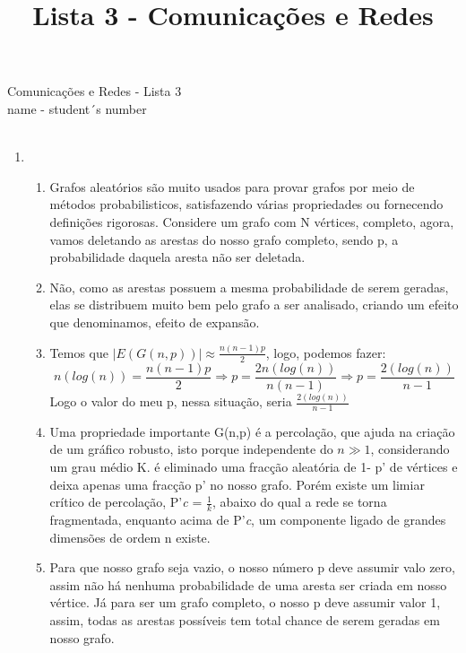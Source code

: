 \documentclass[11pt,reqno]{amsart}
\title {Lista 3 - Comunicações e Redes}
\author{}
\date{}
\begin{document}
	\begin{center}
		Comunicações e Redes - Lista 3\\
		name - student´s number \\ \ \\
	\end{center}

	\begin{enumerate}

		\item

		\vspace{0.3cm}

		\begin{enumerate}
			\item Grafos aleatórios são muito usados para provar grafos por meio de métodos probabilisticos,
			 satisfazendo várias propriedades ou fornecendo definições rigorosas. Considere um grafo com 
			 N vértices, completo, agora, vamos deletando as arestas do nosso grafo completo, sendo p, a 
			 probabilidade daquela aresta não ser deletada.
			\item Não, como as arestas possuem a mesma probabilidade de serem geradas, elas se distribuem 
			muito bem pelo grafo a ser analisado, criando um efeito que denominamos, efeito de expansão.
			\item Temos que $|E(G(n,p))| \approx \frac{n(n-1)p}{2}$, logo, podemos fazer: \[n (log(n)) = 
			\frac{n(n-1)p}{2} \Rightarrow p = \frac{2 n(log(n))}{n(n-1)} \Rightarrow p = \frac{2(log(n))}{n-
			1}\] Logo o valor do meu p, nessa situação, seria $\frac{2(log(n))}{n-1}$
			\item Uma propriedade importante G(n,p) é a percolação, que ajuda na criação de um gráfico 
			robusto, isto porque independente do $n \gg 1$, considerando um grau médio K. é eliminado uma 
			fracção aleatória de 1- p' de vértices e deixa apenas uma fracção p' no nosso grafo.
			Porém existe um limiar crítico de percolação, P'\textit{c} = $\frac{1}{k}$, abaixo do qual 
			a rede se torna fragmentada, enquanto acima de P'\textit{c}, um componente ligado de grandes 
			dimensões de ordem n existe.
			\item Para que nosso grafo seja vazio, o nosso número p deve assumir valo zero, assim não
			há nenhuma probabilidade de uma aresta ser criada em nosso vértice. Já para ser um grafo 
			completo, o nosso p deve assumir valor 1, assim, todas as arestas possíveis tem total chance
			de serem geradas em nosso grafo.
		\end{enumerate}


\end{enumerate}
\end{document}
